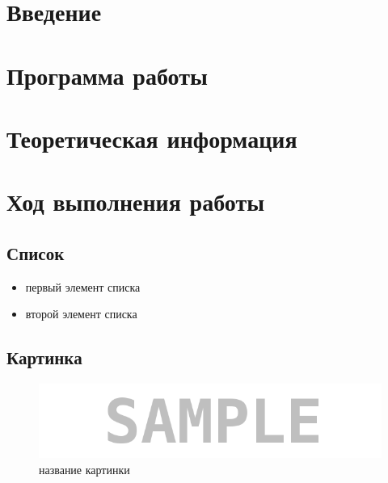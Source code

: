 








\section*{Введение}


\section{Программа работы}


\section{Теоретическая информация}


\section{Ход выполнения работы}

\subsection{Список}

\begin{itemize}
\item первый элемент списка
\item второй элемент списка
\end{itemize}


\subsection{Картинка}

\begin{figure}[H]
	\begin{center}
		\includegraphics[scale=0.7]{pics/sample}
		\caption{название картинки} 
		\label{pic:pic_name} %
	\end{center}
\end{figure}


